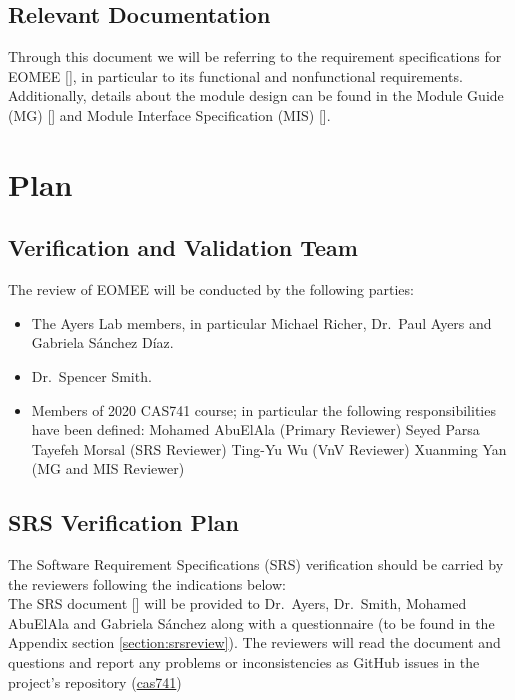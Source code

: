 \documentclass[12pt, titlepage]{article}
\begin{document}
\subsection{Relevant Documentation}


Through this document we will be referring to the requirement specifications 
for EOMEE [\citet{SRS2020}], in particular to its functional and nonfunctional 
requirements. Additionally, details about the module design can be found in the 
Module Guide (MG) [\cite{MG2020}] and Module Interface Specification (MIS) 
[\cite{MIS2020}].

\section{Plan}
\label{section:plans}

\subsection{Verification and Validation Team}

The review of EOMEE will be conducted by the following parties:
\begin{itemize}
	\item The Ayers Lab members, in particular Michael Richer, Dr.\ Paul Ayers 
	and Gabriela S\'anchez D\'iaz.
	\item Dr.\ Spencer Smith.
	\item Members of 2020 CAS741 course; in particular the following 
	responsibilities have been defined:
	\subitem Mohamed AbuElAla (Primary Reviewer)
	\subitem Seyed Parsa Tayefeh Morsal (SRS Reviewer)
	\subitem Ting-Yu Wu (VnV Reviewer)
	\subitem Xuanming Yan (MG and MIS Reviewer)
\end{itemize}

\subsection{SRS Verification Plan}

The Software Requirement Specifications (SRS) verification should be carried by 
the reviewers following the indications below:\\
The SRS document [\cite{SRS2020}] will be provided to Dr.\ Ayers, Dr.\ 
Smith, Mohamed AbuElAla and Gabriela S\'anchez along with a questionnaire (to 
be found in the Appendix section \ref{section:srsreview}). The reviewers 
will read the document and questions and report any problems or 
inconsistencies as GitHub issues in the project's repository 
(\href{https://github.com/gabrielasd/eomee/tree/cas741} 
{cas741})
\end{document}
